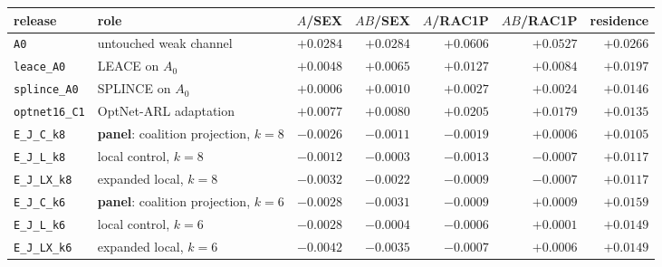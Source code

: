 \begin{tabular}{@{}l l r r r r r@{}}
\toprule
release & role & $A$/SEX & $AB$/SEX & $A$/RAC1P & $AB$/RAC1P & residence \\
\midrule
\texttt{A0} & untouched weak channel & $+0.0284$ & $+0.0284$ & $+0.0606$ & $+0.0527$ & $+0.0266$ \\
\texttt{leace\_A0} & LEACE on $A_0$ & $+0.0048$ & $+0.0065$ & $+0.0127$ & $+0.0084$ & $+0.0197$ \\
\texttt{splince\_A0} & SPLINCE on $A_0$ & $+0.0006$ & $+0.0010$ & $+0.0027$ & $+0.0024$ & $+0.0146$ \\
\texttt{optnet16\_C1} & OptNet-ARL adaptation & $+0.0077$ & $+0.0080$ & $+0.0205$ & $+0.0179$ & $+0.0135$ \\
\midrule
\texttt{E\_J\_C\_k8} & \textbf{panel}: coalition projection, $k{=}8$ & $-0.0026$ & $-0.0011$ & $-0.0019$ & $+0.0006$ & $+0.0105$ \\
\texttt{E\_J\_L\_k8} & local control, $k{=}8$ & $-0.0012$ & $-0.0003$ & $-0.0013$ & $-0.0007$ & $+0.0117$ \\
\texttt{E\_J\_LX\_k8} & expanded local, $k{=}8$ & $-0.0032$ & $-0.0022$ & $-0.0009$ & $-0.0007$ & $+0.0117$ \\
\texttt{E\_J\_C\_k6} & \textbf{panel}: coalition projection, $k{=}6$ & $-0.0028$ & $-0.0031$ & $-0.0009$ & $+0.0009$ & $+0.0159$ \\
\texttt{E\_J\_L\_k6} & local control, $k{=}6$ & $-0.0028$ & $-0.0004$ & $-0.0006$ & $+0.0001$ & $+0.0149$ \\
\texttt{E\_J\_LX\_k6} & expanded local, $k{=}6$ & $-0.0042$ & $-0.0035$ & $-0.0007$ & $+0.0006$ & $+0.0149$ \\
\midrule
\bottomrule
\end{tabular}
